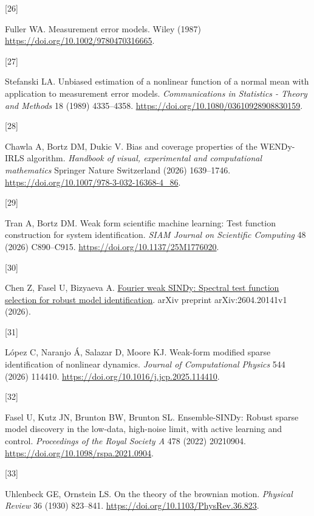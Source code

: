 \documentclass[
  american,
  11pt,
]{article}
\newlength{\cslhangindent}
\newlength{\csllabelwidth}
\newenvironment{CSLReferences}[2] %
 {\begin{list}{}{%
  \setlength{\itemindent}{0pt}
  \setlength{\leftmargin}{0pt}
  \setlength{\parsep}{0pt}
  \ifodd #1
   \setlength{\leftmargin}{\cslhangindent}
   \setlength{\itemindent}{-1\cslhangindent}
  \fi
  \setlength{\itemsep}{#2\baselineskip}}}
 {\end{list}}
\newcommand{\CSLLeftMargin}[1]{\parbox[t]{\csllabelwidth}{\strut#1\strut}}
\newcommand{\CSLRightInline}[1]{\parbox[t]{\linewidth - \csllabelwidth}{\strut#1\strut}}
\begin{document}
\begin{CSLReferences}{0}{0}
\CSLLeftMargin{{[}26{]} }%
\CSLRightInline{Fuller WA. Measurement error models. Wiley (1987)
\url{https://doi.org/10.1002/9780470316665}.}

\CSLLeftMargin{{[}27{]} }%
\CSLRightInline{Stefanski LA. Unbiased estimation of a nonlinear
function of a normal mean with application to measurement error models.
\emph{Communications in Statistics - Theory and Methods} 18 (1989)
4335--4358. \url{https://doi.org/10.1080/03610928908830159}.}

\CSLLeftMargin{{[}28{]} }%
\CSLRightInline{Chawla A, Bortz DM, Dukic V. Bias and coverage
properties of the {WENDy-IRLS} algorithm. \emph{Handbook of visual,
experimental and computational mathematics} Springer Nature Switzerland
(2026) 1639--1746. \url{https://doi.org/10.1007/978-3-032-16368-4_86}.}

\CSLLeftMargin{{[}29{]} }%
\CSLRightInline{Tran A, Bortz DM. Weak form scientific machine learning:
Test function construction for system identification. \emph{SIAM Journal
on Scientific Computing} 48 (2026) C890--C915.
\url{https://doi.org/10.1137/25M1776020}.}

\CSLLeftMargin{{[}30{]} }%
\CSLRightInline{Chen Z, Fasel U, Bizyaeva A.
\href{https://arxiv.org/abs/2604.20141v1}{Fourier weak {SINDy}: Spectral
test function selection for robust model identification}. arXiv preprint
arXiv:2604.20141v1 (2026).}

\CSLLeftMargin{{[}31{]} }%
\CSLRightInline{López C, Naranjo Á, Salazar D, Moore KJ. Weak-form
modified sparse identification of nonlinear dynamics. \emph{Journal of
Computational Physics} 544 (2026) 114410.
\url{https://doi.org/10.1016/j.jcp.2025.114410}.}

\CSLLeftMargin{{[}32{]} }%
\CSLRightInline{Fasel U, Kutz JN, Brunton BW, Brunton SL.
Ensemble-{SINDy}: Robust sparse model discovery in the low-data,
high-noise limit, with active learning and control. \emph{Proceedings of
the Royal Society A} 478 (2022) 20210904.
\url{https://doi.org/10.1098/rspa.2021.0904}.}

\CSLLeftMargin{{[}33{]} }%
\CSLRightInline{Uhlenbeck GE, Ornstein LS. On the theory of the brownian
motion. \emph{Physical Review} 36 (1930) 823--841.
\url{https://doi.org/10.1103/PhysRev.36.823}.}


\end{CSLReferences}
\end{document}
